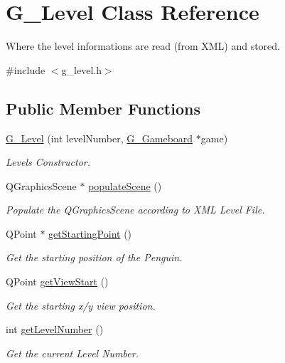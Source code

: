 \hypertarget{class_g___level}{}\section{G\+\_\+\+Level Class Reference}
\label{class_g___level}


Where the level informations are read (from X\+M\+L) and stored.  




{\ttfamily \#include $<$g\+\_\+level.\+h$>$}

\subsection*{Public Member Functions}
\begin{DoxyCompactItemize}
\item 
\hyperlink{class_g___level_a38ac069cc3b5490988f71aad58442581}{G\+\_\+\+Level} (int level\+Number, \hyperlink{class_g___gameboard}{G\+\_\+\+Gameboard} $\ast$game)
\begin{DoxyCompactList}\small\item\em Level\textquotesingle{}s Constructor. \end{DoxyCompactList}\item 
Q\+Graphics\+Scene $\ast$ \hyperlink{class_g___level_a3d34ee97aa649f7e72c6bb8a1fcd02a1}{populate\+Scene} ()
\begin{DoxyCompactList}\small\item\em Populate the Q\+Graphics\+Scene according to X\+M\+L Level File. \end{DoxyCompactList}\item 
Q\+Point $\ast$ \hyperlink{class_g___level_ae90beef96e5793703baf53667286ad56}{get\+Starting\+Point} ()
\begin{DoxyCompactList}\small\item\em Get the starting position of the Penguin. \end{DoxyCompactList}\item 
Q\+Point \hyperlink{class_g___level_a66909b5d2a0a5d0667a493dac8114572}{get\+View\+Start} ()
\begin{DoxyCompactList}\small\item\em Get the starting x/y view position. \end{DoxyCompactList}\item 
int \hyperlink{class_g___level_a4e25af74391b572f9a66865007078777}{get\+Level\+Number} ()
\begin{DoxyCompactList}\small\item\em Get the current Level Number. \end{DoxyCompactList}\item 

\end{DoxyCompactItemize}
